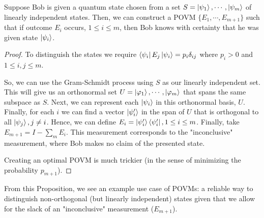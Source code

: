 \documentclass[main.tex]{subfiles}
\begin{document}
%
%
\begin{proposition} Suppose Bob is given a quantum state chosen from a set $S = \ket{\psi_1} , \cdots , \ket{\psi_m}$ of linearly independent states. Then, we can construct a POVM $\{ E_1 , \cdots , E_{m+1} \}$ such that if outcome $E_i$ occurs, $1 \leq i \leq m$, then Bob knows with certainty that he was given state $\ket{\psi_i}$.

\begin{proof}
To distinguish the states we require $\bra{\psi_i} E_j \ket{\psi_i} = p_i \delta_{ij}$ where $p_i > 0$ and $1 \leq i,j \leq m$.

So, we can use the Gram-Schmidt process using $S$ as our linearly independent set. This will give us an orthonormal set $U = \ket{\varphi_1} , \cdots , \ket{\varphi_m}$ that spans the same subspace as $S$. Next, we can represent each $\ket{\psi_i}$ in this orthonormal basis, $U$. Finally, for each $i$ we can find a vector $\ket{\psi'_i}$ in the span of $U$ that is orthogonal to all $\ket{\psi_j}, j \neq i$. Hence, we can define $E_i = \ket{\psi_i'} \bra{\psi_i'}, 1 \leq i \leq m$. Finally, take $E_{m+1} = I - \sum_m E_i$. This measurement corresponds to the "inconclusive" measurement, where Bob makes no claim of the presented state.

Creating an optimal POVM is much trickier (in the sense of minimizing the probability $p_{m+1}$).
\end{proof}
\end{proposition}

From this Proposition, we see an example use case of POVMs: a reliable way to distinguish non-orthogonal (but linearly independent) states given that we allow for the slack of an "inconclusive" measurement ($E_{m+1}$).
\end{document}
